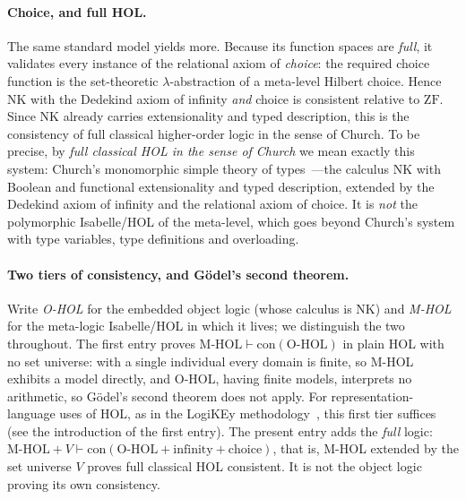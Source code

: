 \documentclass[11pt,a4paper]{article}
\begin{document}
\paragraph{Choice, and full HOL.}
The same standard model yields more.  Because its function spaces are
\emph{full}, it validates every instance of the relational axiom of
\emph{choice}: the required choice function is the set-theoretic
$\lambda$-abstraction of a meta-level Hilbert choice.  Hence $\mathrm{NK}$
with the Dedekind axiom of infinity \emph{and} choice is consistent relative
to $\mathrm{ZF}$.  Since $\mathrm{NK}$ already carries extensionality and
typed description, this is the consistency of full classical higher-order
logic in the sense of Church.  To be precise, by \emph{full classical HOL in
the sense of Church} we mean exactly this system: Church's monomorphic simple
theory of types~\cite{Church40}---the calculus $\mathrm{NK}$ with Boolean and
functional extensionality and typed description, extended by the Dedekind
axiom of infinity and the relational axiom of choice.  It is \emph{not} the
polymorphic Isabelle/HOL of the meta-level, which goes beyond Church's system
with type variables, type definitions and overloading.

\paragraph{Two tiers of consistency, and G\"odel's second theorem.}
Write \emph{O-HOL} for the embedded object logic (whose calculus is
$\mathrm{NK}$) and \emph{M-HOL} for the meta-logic Isabelle/HOL in which
it lives; we distinguish the two throughout.  The first entry proves
$\text{M-HOL}\vdash\mathrm{con}(\text{O-HOL})$ in plain HOL with no set
universe: with a single individual every domain is finite, so M-HOL
exhibits a model directly, and O-HOL, having finite models, interprets
no arithmetic, so G\"odel's second theorem does not apply.  For
representation-language uses of HOL, as in the LogiKEy
methodology~\cite{LogiKEy}, this first tier suffices (see the
introduction of the first entry).  The present entry adds the \emph{full}
logic:
$\text{M-HOL}+V\vdash\mathrm{con}(\text{O-HOL}+\text{infinity}+\text{choice})$,
that is, M-HOL extended by the set universe $V$ proves full classical
HOL consistent.  It is not the object logic proving its own consistency.
\end{document}
